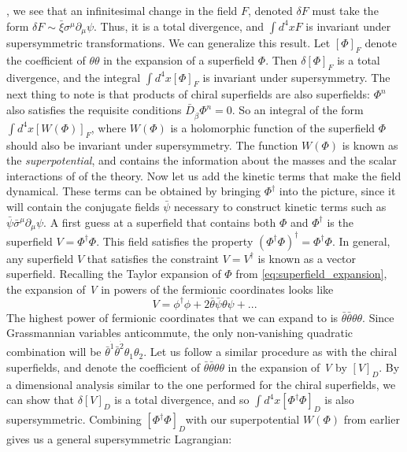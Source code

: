 , we see that an infinitesimal change in the field $F$, denoted $\delta F$ must take the form $\delta F\sim\bar{\xi}\sigma^\mu\partial_\mu\psi$. Thus, it is a total divergence, and $\int d^4x F$ is invariant under supersymmetric transformations. We can generalize this result. Let $[\Phi]_F$ denote the coefficient of $\theta\theta$ in the expansion of a superfield $\Phi$. Then $\delta[\Phi]_F$ is a total divergence, and the integral $\int d^4x [\Phi]_F$ is invariant under supersymmetry. The next thing to note is that products of chiral superfields are also superfields: $\Phi^n$ also satisfies the requisite conditions $\bar{D}_{\dot{\beta}}\Phi^n = 0$. So an integral of the form $\int d^4x[W(\Phi)]_F$, where $W(\Phi)$ is a holomorphic  function of the superfield $\Phi$ should also be invariant under supersymmetry. The function $W(\Phi)$ is known as the \emph{superpotential}, and contains the information about the masses and the scalar interactions of of the theory. Now let us add the kinetic terms that make the field dynamical. These terms can be obtained by bringing $\Phi^\dagger$ into the picture, since it will contain the conjugate fields $\bar{\psi}$ necessary to construct kinetic terms such as $\bar{\psi}\bar{\sigma}^\mu\partial_\mu\psi$. A first guess at a superfield that contains both $\Phi$ and $\Phi^\dagger$ is the superfield $V = \Phi^\dagger\Phi$. This field satisfies the property $(\Phi^\dagger\Phi)^\dagger = \Phi^\dagger\Phi$. In general, any superfield $V$ that satisfies the constraint $V = V^\dagger$ is known as a vector superfield.
Recalling the Taylor expansion of $\Phi$ from \eqref{eq:superfield_expansion}, the expansion of \emph{V} in powers of the fermionic coordinates looks like
\[V = \phi^\dagger\phi + 2\bar{\theta}\bar{\psi}\theta\psi + ...\]
The highest power of fermionic coordinates that we can expand to is $\bar{\theta}\bar{\theta}\theta\theta$. Since Grassmannian variables anticommute, the only non-vanishing quadratic combination will be $\bar{\theta}^{\dot{1}}\bar{\theta}^{\dot{2}}\theta_1\theta_2$. Let us follow a similar procedure as with the chiral superfields, and denote the coefficient of $\bar{\theta}\bar{\theta}\theta\theta$ in the expansion of \emph{V} by $[V]_D$. By a dimensional analysis similar to the one performed for the chiral superfields, we can show that $\delta[V]_D$ is a total divergence, and so $\int d^4x[\Phi^\dagger\Phi]_D$ is also supersymmetric. Combining $[\Phi^\dagger\Phi]_D$with our superpotential $W(\Phi)$ from earlier gives us a general supersymmetric Lagrangian:
